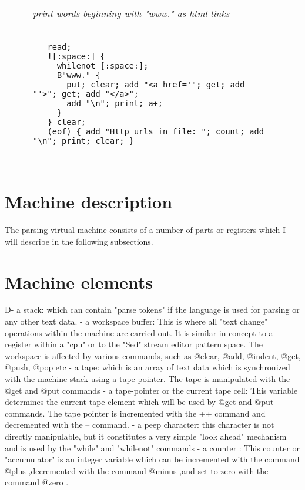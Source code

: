 \documentclass[a4paper,12pt]{article}
\begin{document}
 \begin{figure}
 \begin{tabular}{ l }
 \emph{ print words beginning with "www." as html links  } \\ 
 \begin{lstlisting}[breaklines] 

   read; 
   ![:space:] { 
     whilenot [:space:]; 
     B"www." { 
       put; clear; add "<a href='"; get; add "'>"; get; add "</a>";
       add "\n"; print; a+; 
     }
   } clear;
   (eof) { add "Http urls in file: "; count; add "\n"; print; clear; }
 
 \end{lstlisting} 
 \end{tabular} 

 \end{figure}

\section{Machine description}

  The parsing virtual machine consists of a number of parts or registers
  which I will describe in the following subsections.

\section{Machine elements}

   D- a stack:
      which can contain "parse tokens" if the language
      is used for parsing or any other text data.
    - a workspace buffer:
      This is where all "text change" operations within the machine are
      carried out. It is similar in concept to a register within
      a "cpu" or to the "Sed" stream editor
      pattern space. The workspace is affected by various commands,
      such as @clear, @add, @indent, @get, @push, @pop etc
    - a tape:
      which is an array of text data which is synchronized with the
      machine stack using a tape pointer. The tape is manipulated
      with the @get and @put commands
    - a tape-pointer or the current tape cell:
      This variable determines the current tape element which will
      be used by @get and @put commands. The tape pointer is incremented
      with the ++ command and decremented with the -- command.
    - a peep character:
      this character is not directly manipulable, but it constitutes
      a very simple "look ahead" mechanism and is used by the
      "while" and "whilenot" commands
    - a counter :
      This counter or "accumulator" is an integer variable which can
      be incremented with the command @plus ,decremented with the
      command @minus ,and set to zero with the command @zero .
\end{document}
